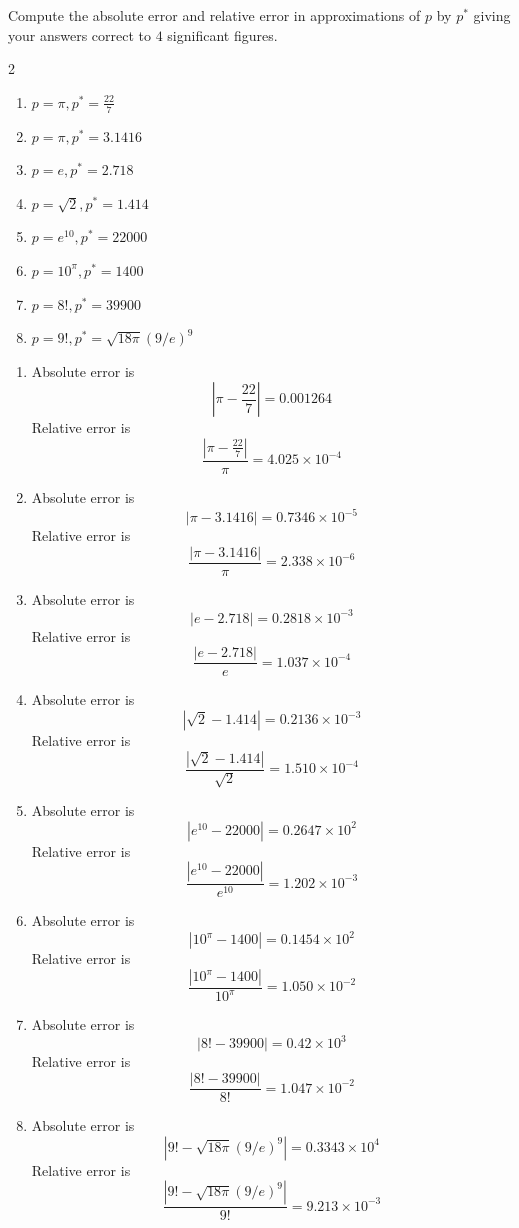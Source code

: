 \begin{myexercise}%
Compute the absolute error and relative error in approximations of $p$ by $p^{*}$ giving your answers correct to $4$ significant figures.
\begin{multicols}{2}
\begin{enumerate}[label=(\alph*)]
\item  $p=\pi, p^{*}=\frac{22}{7}$
\item $p=\pi, p^{*}=3.1416$
\item $p=e, p^{*}=2.718$
\item $p=\sqrt{2}, p^{*}=1.414$
\item $p=e^{10}, p^{*}=22000$
\item $p=10^{\pi}, p^{*}=1400$
\item $p=8!, p^{*}=39900$
\item $p=9!, p^{*}=\sqrt{18 \pi}(9 / e)^{9}$ 
\end{enumerate}
\end{multicols}
\end{myexercise}

\begin{mysolution}
\begin{enumerate}[label=(\alph*)]
\item  Absolute error is
\[\left|\pi-\frac{22}{7}\right|=0.001264\]
Relative error is
\[\frac{\left|\pi-\frac{22}{7}\right|}{\pi}=4.025\times 10^{-4}\]
\item Absolute error is
\[\left|\pi-3.1416\right|=0.7346\times10^{-5}\]
Relative error is
\[\frac{\left|\pi-3.1416\right|}{\pi}=2.338\times 10^{-6}\]
\item Absolute error is
\[\left|e-2.718\right|=0.2818\times10^{-3}\]
Relative error is
\[\frac{\left|e-2.718\right|}{e}=1.037\times 10^{-4}\]
\item Absolute error is
\[\left|\sqrt{2}-1.414\right|=0.2136\times10^{-3}\]
Relative error is
\[\frac{\left|\sqrt{2}-1.414\right|}{\sqrt{2}}=1.510\times 10^{-4}\]
\item Absolute error is
\[\left|e^{10}-22000\right|=0.2647\times10^{2}\]
Relative error is
\[\frac{\left|e^{10}-22000\right|}{e^{10}}=1.202\times 10^{-3}\]
\item Absolute error is
\[\left|10^{\pi}-1400\right|=0.1454\times10^{2}\]
Relative error is
\[\frac{\left|10^{\pi}-1400\right|}{10^{\pi}}=1.050\times 10^{-2}\]
\item Absolute error is
\[\left|8!-39900\right|=0.42\times10^{3}\]
Relative error is
\[\frac{\left|8!-39900\right|}{8!}=1.047\times 10^{-2}\]
\item Absolute error is
\[\left|9!-\sqrt{18 \pi}(9 / e)^{9}\right|=0.3343\times10^{4}\]
Relative error is
\[\frac{\left|9!-\sqrt{18 \pi}(9 / e)^{9}\right|}{9!}=9.213\times 10^{-3}\]
\end{enumerate}
%
\end{mysolution}


